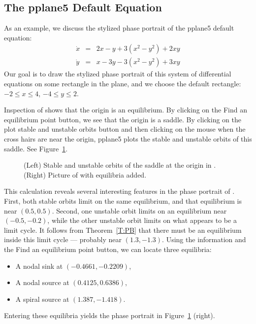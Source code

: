 \documentclass{ximera}
\begin{document}
\subsection*{The {\sf pplane5} Default Equation}

As an example, we discuss the stylized phase portrait of the 
{\sf pplane5} default equation:
\begin{equation}  \label{e:default}
\begin{array}{rcl}
\dot{x} & = & 2x-y+3(x^2-y^2)+2xy \\
\dot{y} & = & x-3y-3(x^2-y^2)+3xy
\end{array}
\end{equation} 
Our goal is to draw the stylized phase portrait of this system
of differential equations on some rectangle in the plane, and we
choose the default rectangle: $-2\leq x\leq 4$, $-4\leq y\leq 2$.

Inspection of  shows that the origin 
is an equilibrium.  By clicking on the {\sf Find an equilibrium point}
button, we see that the origin is a saddle.  By clicking on the
{\sf plot stable and unstable orbits} button and then clicking
on the mouse when the cross hairs are near the origin, {\sf
pplane5} plots the stable and unstable orbits of this saddle.
See Figure~\ref{F:default0}.

\begin{figure}[htb]
           \centerline{%
	   }
           \caption{(Left) Stable and unstable orbits of the saddle at
		the origin in \protect{}. (Right) Picture 
		of \protect{} with equilibria added.}
           \label{F:default0}
\end{figure}
 
This calculation reveals several interesting features in the
phase portrait of .  First, both stable orbits limit on the 
same equilibrium, and that equilibrium is near $(0.5,0.5)$.  Second, one 
unstable orbit limits on an equilibrium near $(-0.5,-0.2)$, while the other 
unstable orbit limits on what appears to be a limit cycle.  It follows from 
Theorem~\ref{T:PB} that there must be an equilibrium inside this limit cycle 
--- probably near $(1.3,-1.3)$.  Using the information and the {\sf
Find an equilibrium point} button, we can locate three
equilibria:
\begin{itemize}
\item	A nodal sink at $(-0.4661,-0.2209)$,
\item	A nodal source at $(0.4125,0.6386)$,
\item	A spiral source at $(1.387,-1.418)$. 
\end{itemize}
Entering these equilibria yields the phase portrait in 
Figure~\ref{F:default0} (right). 
\end{document}
